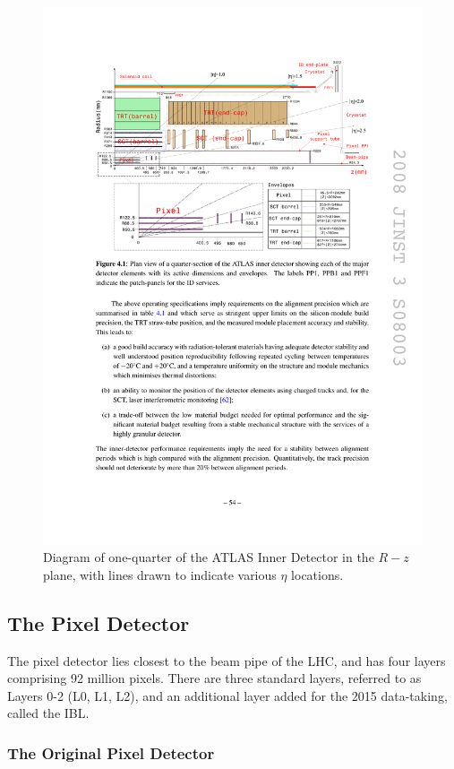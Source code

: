 \begin{centering}
\begin{figure}[bth]
\myfloatalign
\includegraphics[width=.90\linewidth]{figures/atlas/ideta.pdf}
\caption{Diagram of one-quarter of the \ac{ATLAS} Inner Detector in the $R-z$ plane, with lines drawn to indicate various $\eta$ locations.}
\label{fig:IDeta}
\end{figure}
\end{centering}

\subsection{The Pixel Detector}

The pixel detector lies closest to the beam pipe of the \ac{LHC}, and has four layers comprising 92 million pixels. There are three standard layers, referred to as Layers 0-2 (L0, L1, L2), and an additional layer added for the 2015 data-taking, called the \ac{IBL}. 

\subsubsection{The Original Pixel Detector}

